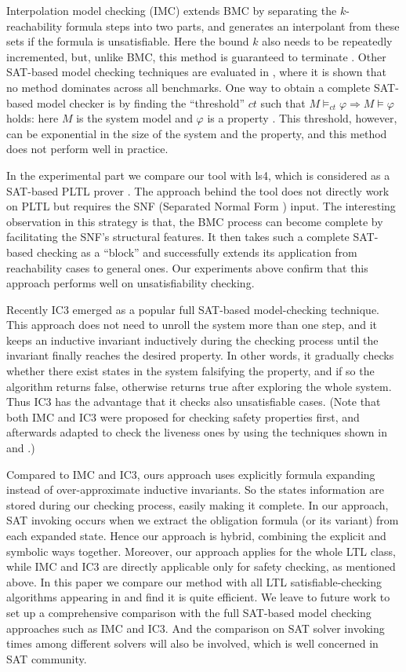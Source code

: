 \documentclass[conference]{IEEEtran}
\def\phi{\varphi}
\begin{document}
Interpolation model checking (IMC) \cite{McM03} extends BMC by separating the $k$-reachability formula
steps into two parts, and generates an interpolant from these sets if the formula is unsatisfiable. 
Here the bound $k$ also needs to be repeatedly incremented, but, unlike BMC, this method is
guaranteed to terminate \cite{McM03}. Other SAT-based model checking techniques are evaluated
in \cite{ADKKM05}, where it is shown that no method dominates across all benchmarks.
One way to obtain a complete SAT-based model checker is by finding the ``threshold'' $ct$ such 
that $M\models_{ct}\phi\Rightarrow M\models\phi$ holds: here $M$ is the system model and $\phi$ is 
a property \cite{CKOS05}. This threshold, however, can be exponential in the size of the system
and the property, and this method does not perform well in practice.

In the experimental part we compare our tool with ls4, which is considered as a SAT-based PLTL prover \cite{SW12}. 
The approach behind the tool does not directly work on PLTL but requires the SNF (Separated Normal Form \cite{Fish97}) input. The 
interesting observation in this strategy is that, the BMC process can become complete by facilitating the SNF's structural 
features. It then takes such a complete SAT-based checking as a ``block'' and successfully extends its application from 
reachability cases to general ones. Our experiments above confirm that this approach performs well on unsatisfiability 
checking. 

Recently IC3 \cite{Bra11} emerged as a popular full SAT-based model-checking technique. 
This approach does not need to unroll the system more than one step, and it keeps an 
inductive invariant inductively during the checking process until the invariant finally 
reaches the desired property. In other words, it gradually checks whether there exist states 
in the system falsifying the property, and if so the algorithm returns false, otherwise 
returns true after exploring the whole system. Thus IC3 has the advantage that it checks also 
unsatisfiable cases.  (Note that both IMC and IC3 were proposed for checking safety properties 
first, and afterwards adapted to check the liveness ones by using the techniques shown in \cite{BAS02} and \cite{BSHZ11}.)

Compared to IMC and IC3, ours approach uses explicitly formula expanding instead of over-approximate 
inductive invariants. So the states information are stored during our checking process, easily making
it complete. In our approach, SAT invoking occurs when we extract the obligation formula (or its variant) 
from each expanded state. Hence our approach is hybrid, combining the explicit and symbolic ways together. 
Moreover, our approach applies for the whole LTL class, while IMC and IC3 are directly applicable
only for safety checking, as mentioned above. In this paper we compare our method with all LTL 
satisfiable-checking algorithms appearing in \cite{SD11} and find it is quite efficient. We leave to
future work to set up a comprehensive comparison with the full SAT-based model checking approaches 
such as IMC and IC3. And the comparison on SAT solver invoking times among different solvers will 
also be involved, which is well concerned in SAT community.
\end{document}
